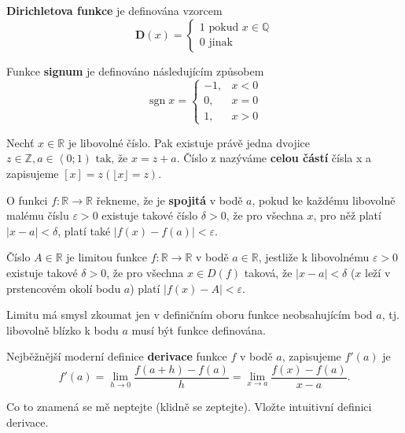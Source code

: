 \begin{definition}
  \textbf{Dirichletova funkce} je definována vzorcem
  $$\mathbf{D} (x) = \begin{cases}
1 \text{ pokud } x \in \mathbb Q \\
0 \text{ jinak }
  \end{cases}  $$
\end{definition}

\begin{definition}
  Funkce \textbf{signum} je definováno následujícím způsobem $$\operatorname {sgn} x={\begin{cases}-1,&x<0\\0,&x=0\\1,&x>0\end{cases}}$$
\end{definition}

\begin{definition}
  Nechť $x \in \mathbb{R}$ je libovolné číslo. Pak existuje právě jedna dvojice $z \in \mathbb{Z}, a \in \left \langle 0;1 \right) \text{ tak, že } x = z + a$.
Číslo z nazýváme \textbf{celou částí} čísla x a zapisujeme $[x] = z (\lfloor x \rfloor = z)$.
\end{definition}

\begin{definition}
  O funkci $f:\mathbb {R} \rightarrow \mathbb {R}$ řekneme, že je \textbf{spojitá} v bodě $a$, pokud ke každému libovolně malému číslu $\varepsilon >0$ existuje takové číslo $\delta >0$, že pro všechna $x$, pro něž platí $|x-a|<\delta$, platí také $|f(x)-f(a)|<\varepsilon$.
\end{definition}

\begin{definition}
  Číslo $A\in \mathbb {R}$ je limitou funkce $f:\mathbb {R} \rightarrow \mathbb {R}$ v bodě $ a\in \mathbb {R}$, jestliže k libovolnému $ \varepsilon >0$ existuje takové $ \delta >0$, že pro všechna $x\in D(f)$ taková, že $ \left|x-a\right|<\delta$ ($x$ leží v prstencovém okolí bodu $a$) platí $\left|f(x)-A\right|<\varepsilon $.

  Limitu má smysl zkoumat jen v definičním oboru funkce neobsahujícím bod $a$, tj. libovolně blízko k bodu $a$ musí být funkce definována.
\end{definition}

\begin{definition}
  Nejběžnější moderní definice \textbf{derivace} funkce $f$ v bodě $a$, zapisujeme $f'(a)$ je
  $$f'(a)=\lim _{h\to 0}{\frac {f(a+h)-f(a)}{h}}=\lim _{x\to a}{\frac {f(x)-f(a)}{x-a}}.$$

  Co to znamená se mě neptejte (klidně se zeptejte). Vložte intuitivní definici derivace.
\end{definition}

